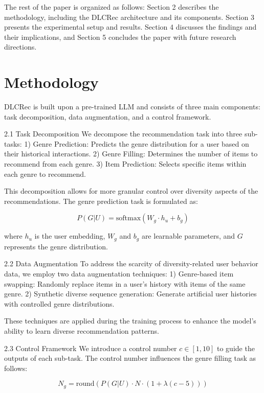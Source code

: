 \documentclass[12pt,letterpaper]{article}
\begin{document}
The rest of the paper is organized as follows: Section 2 describes the methodology, including the DLCRec architecture and its components. Section 3 presents the experimental setup and results. Section 4 discusses the findings and their implications, and Section 5 concludes the paper with future research directions.

\section{Methodology}

DLCRec is built upon a pre-trained LLM and consists of three main components: task decomposition, data augmentation, and a control framework.

2.1 Task Decomposition
We decompose the recommendation task into three sub-tasks:
1) Genre Prediction: Predicts the genre distribution for a user based on their historical interactions.
2) Genre Filling: Determines the number of items to recommend from each genre.
3) Item Prediction: Selects specific items within each genre to recommend.

This decomposition allows for more granular control over diversity aspects of the recommendations. The genre prediction task is formulated as:

\begin{equation}
P(G|U) = \text{softmax}(W_g \cdot h_u + b_g)
\end{equation}

where $h_u$ is the user embedding, $W_g$ and $b_g$ are learnable parameters, and $G$ represents the genre distribution.

2.2 Data Augmentation
To address the scarcity of diversity-related user behavior data, we employ two data augmentation techniques:
1) Genre-based item swapping: Randomly replace items in a user's history with items of the same genre.
2) Synthetic diverse sequence generation: Generate artificial user histories with controlled genre distributions.

These techniques are applied during the training process to enhance the model's ability to learn diverse recommendation patterns.

2.3 Control Framework
We introduce a control number $c \in [1, 10]$ to guide the outputs of each sub-task. The control number influences the genre filling task as follows:

\begin{equation}
N_g = \text{round}(P(G|U) \cdot N \cdot (1 + \lambda(c - 5)))
\end{equation}
\end{document}
